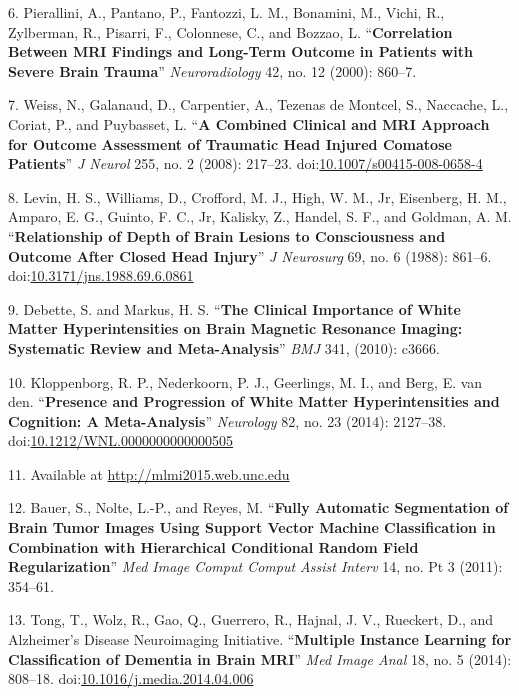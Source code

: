 \documentclass[11pt,]{article}
\begin{document}
\hypertarget{ref-Pierallini:2000aa}{}
6. Pierallini, A., Pantano, P., Fantozzi, L. M., Bonamini, M., Vichi,
R., Zylberman, R., Pisarri, F., Colonnese, C., and Bozzao, L.
``\textbf{Correlation Between MRI Findings and Long-Term Outcome in
Patients with Severe Brain Trauma}'' \emph{Neuroradiology} 42, no. 12
(2000): 860--7.

\hypertarget{ref-Weiss:2008aa}{}
7. Weiss, N., Galanaud, D., Carpentier, A., Tezenas de Montcel, S.,
Naccache, L., Coriat, P., and Puybasset, L. ``\textbf{A Combined
Clinical and MRI Approach for Outcome Assessment of Traumatic Head
Injured Comatose Patients}'' \emph{J Neurol} 255, no. 2 (2008): 217--23.
doi:\href{https://doi.org/10.1007/s00415-008-0658-4}{10.1007/s00415-008-0658-4}

\hypertarget{ref-Levin:1988aa}{}
8. Levin, H. S., Williams, D., Crofford, M. J., High, W. M., Jr,
Eisenberg, H. M., Amparo, E. G., Guinto, F. C., Jr, Kalisky, Z., Handel,
S. F., and Goldman, A. M. ``\textbf{Relationship of Depth of Brain
Lesions to Consciousness and Outcome After Closed Head Injury}'' \emph{J
Neurosurg} 69, no. 6 (1988): 861--6.
doi:\href{https://doi.org/10.3171/jns.1988.69.6.0861}{10.3171/jns.1988.69.6.0861}

\hypertarget{ref-Debette:2010aa}{}
9. Debette, S. and Markus, H. S. ``\textbf{The Clinical Importance of
White Matter Hyperintensities on Brain Magnetic Resonance Imaging:
Systematic Review and Meta-Analysis}'' \emph{BMJ} 341, (2010): c3666.

\hypertarget{ref-Kloppenborg:2014aa}{}
10. Kloppenborg, R. P., Nederkoorn, P. J., Geerlings, M. I., and Berg,
E. van den. ``\textbf{Presence and Progression of White Matter
Hyperintensities and Cognition: A Meta-Analysis}'' \emph{Neurology} 82,
no. 23 (2014): 2127--38.
doi:\href{https://doi.org/10.1212/WNL.0000000000000505}{10.1212/WNL.0000000000000505}

\hypertarget{ref-mlmi2015}{}
11. Available at \url{http://mlmi2015.web.unc.edu}

\hypertarget{ref-Bauer:2011aa}{}
12. Bauer, S., Nolte, L.-P., and Reyes, M. ``\textbf{Fully Automatic
Segmentation of Brain Tumor Images Using Support Vector Machine
Classification in Combination with Hierarchical Conditional Random Field
Regularization}'' \emph{Med Image Comput Comput Assist Interv} 14, no.
Pt 3 (2011): 354--61.

\hypertarget{ref-Tong:2014aa}{}
13. Tong, T., Wolz, R., Gao, Q., Guerrero, R., Hajnal, J. V., Rueckert,
D., and Alzheimer's Disease Neuroimaging Initiative. ``\textbf{Multiple
Instance Learning for Classification of Dementia in Brain MRI}''
\emph{Med Image Anal} 18, no. 5 (2014): 808--18.
doi:\href{https://doi.org/10.1016/j.media.2014.04.006}{10.1016/j.media.2014.04.006}
\end{document}
